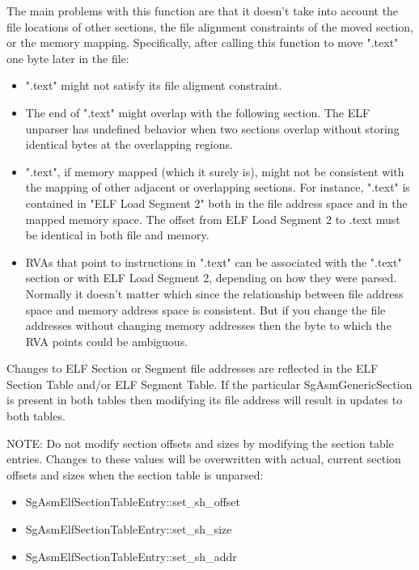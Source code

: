   The main problems with this function are that it doesn't take into account the file locations of other sections, the file
   alignment constraints of the moved section, or the memory mapping. Specifically, after calling this function to move ".text"
   one byte later in the file:
\begin{itemize}
   \item ".text" might not satisfy its file aligment constraint.

   \item The end of ".text" might overlap with the following section. The ELF unparser has undefined behavior when two sections
     overlap without storing identical bytes at the overlapping regions.

   \item ".text", if memory mapped (which it surely is), might not be consistent with the mapping of other adjacent or overlapping
     sections. For instance, ".text" is contained in "ELF Load Segment 2" both in the file address space and in the mapped
     memory space. The offset from ELF Load Segment 2 to .text must be identical in both file and memory.

   \item RVAs that point to instructions in ".text" can be associated with the ".text" section or with ELF Load Segment 2,
     depending on how they were parsed. Normally it doesn't matter which since the relationship between file address space and
     memory address space is consistent. But if you change the file addresses without changing memory addresses then the byte
     to which the RVA points could be ambiguous.
\end{itemize}

   Changes to ELF Section or Segment file addresses are reflected in the ELF Section Table and/or ELF Segment Table. If the
   particular SgAsmGenericSection is present in both tables then modifying its file address will result in updates to both
   tables.

   NOTE: Do not modify section offsets and sizes by modifying the section table entries. Changes to these values will be
   overwritten with actual, current section offsets and sizes when the section table is unparsed:
\begin{itemize}
	\item SgAsmElfSectionTableEntry::set\_sh\_offset
	\item SgAsmElfSectionTableEntry::set\_sh\_size
	\item SgAsmElfSectionTableEntry::set\_sh\_addr
\end{itemize}

